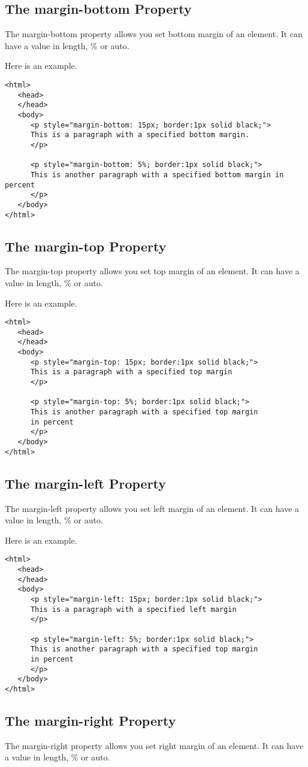 \documentclass[a4paper,oneside]{book}
\numberwithin{equation}{chapter}
\begin{document}
\subsection{The margin-bottom Property}
The margin-bottom property allows you set bottom margin of an element. It can have a value in length, \% or auto.

Here is an example.
\begin{verbatim}
<html>
   <head>
   </head>
   <body>
      <p style="margin-bottom: 15px; border:1px solid black;">
      This is a paragraph with a specified bottom margin.
      </p> 
   
      <p style="margin-bottom: 5%; border:1px solid black;"> 
      This is another paragraph with a specified bottom margin in percent
      </p>
   </body>
</html> 
\end{verbatim}
\subsection{The margin-top Property}
The margin-top property allows you set top margin of an element. It can have a value in length, \% or auto.

Here is an example.
\begin{verbatim}
<html>
   <head>
   </head>
   <body>
      <p style="margin-top: 15px; border:1px solid black;"> 
      This is a paragraph with a specified top margin 
      </p> 
      
      <p style="margin-top: 5%; border:1px solid black;"> 
      This is another paragraph with a specified top margin 
      in percent 
      </p>
   </body>
</html> 
\end{verbatim}
\subsection{The margin-left Property}
The margin-left property allows you set left margin of an element. It can have a value in length, \% or auto.

Here is an example.
\begin{verbatim}
<html>
   <head>
   </head>
   <body>
      <p style="margin-left: 15px; border:1px solid black;"> 
      This is a paragraph with a specified left margin 
      </p> 
   
      <p style="margin-left: 5%; border:1px solid black;"> 
      This is another paragraph with a specified top margin 
      in percent 
      </p>
   </body>
</html> 
\end{verbatim}
\subsection{The margin-right Property}
The margin-right property allows you set right margin of an element. It can have a value in length, \% or auto.
\end{document}
